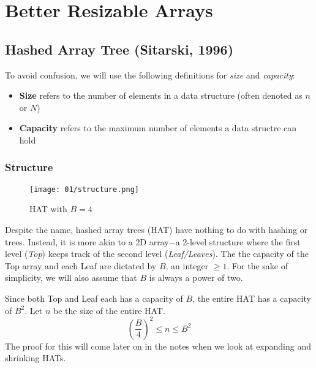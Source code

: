 \chapter{Better Resizable Arrays}

\section{Hashed Array Tree (Sitarski, 1996)}

\begin{tcolorbox}[title=Terminology]
	To avoid confusion, we will use the following definitions for \textit{size} and \textit{capacity}:
	\begin{itemize}
		\item \textbf{Size} refers to the number of elements in a data structure (often denoted as $n$ or $N$)
		\item \textbf{Capacity} refers to the maximum number of elements a data structre can hold
	\end{itemize}
\end{tcolorbox}

\subsection*{Structure}

\begingroup

\begin{wrapfigure}{l}{0.4\textwidth}
	\centering
	\texttt{[image: 01/structure.png]}
    \caption{HAT with $B=4$}\label{hashed-tree-diagram}
\end{wrapfigure}
Despite the name, hashed array trees (HAT) have nothing to do with hashing or trees. Instead, it is more
akin to a 2D array$-$a 2-level structure where the first level (\textit{Top}) keeps track of the 
second level (\textit{Leaf/Leaves}). The the capacity of the Top array and each Leaf are dictated
by $B$, an integer $\geq1$. For the sake of simplicity, we will also assume that $B$ is always
a power of two.

Since both Top and Leaf each has a capacity of $B$, the entire HAT has a capacity of $B^2$.
Let $n$ be the size of the entire HAT.
\begin{equation}\label{hat-invariant}
	\left(\frac{B}{4}\right)^2 \leq n \leq B^2
\end{equation}
The proof for this will come later on in the notes when we look at expanding and shrinking HATs.

\endgroup


